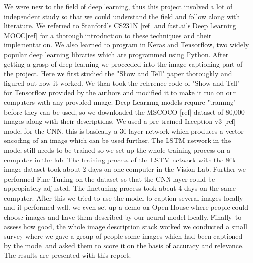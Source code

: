 \documentclass[11pt]{article}
\begin{document}
 We were new to the field of deep learning, thus this project involved a lot of independent study so that we could understand the field and follow along with literature. We referred to Stanford's CS231N [ref] and fast.ai's Deep Learning MOOC[ref] for a thorough introduction to these techniques and their implementation. We also learned to program in Keras and Tensorflow, two widely popular deep learning libraries which are programmed using Python.  After getting a grasp of deep learning we proceeded into the image captioning part of the project. Here we first studied the "Show and Tell" paper thoroughly and figured out how it worked. We then took the reference code of "Show and Tell" for Tensorflow provided by the authors and modified it to make it run on our computers with any provided image. Deep Learning models require "training" before they can be used, so we downloaded the MSCOCO [ref] dataset of 80,000 images along with their descriptions. We used a pre-trained Inception v3 [ref] model for the CNN, this is basically a 30 layer network which produces a vector encoding of an image which can be used further. The LSTM network in the model still needs to be trained so we set up the whole training process on a computer in the lab. The training process of the LSTM network with the 80k image dataset took about 2 days on one computer in the Vision Lab. Further we performed Fine-Tuning on the dataset so that the CNN layer could be appropiately adjusted. The finetuning process took about 4 days on the same computer. After this we tried to use the model to caption several images locally and it performed well. we even set up a demo on Open House where people could choose images and have them described by our neural model locally. Finally, to assess how good, the whole image description stack worked we conducted a small survey where we gave a group of people some images which had been captioned by the model and asked them to score it on the basis of accuracy and relevance. The results are presented with this report.
\end{document}
